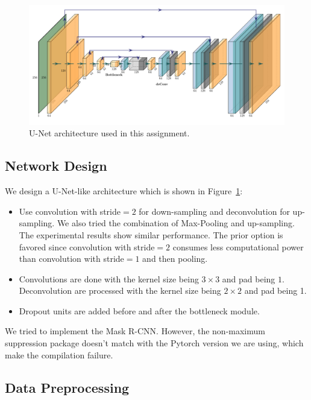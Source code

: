 \documentclass[runningheads]{llncs}
\begin{document}
\begin{figure}[ht]
	\centering
	\includegraphics[scale=0.5]{figures/Unet}
	\caption{U-Net architecture used in this assignment.}
	\label{fig:U-Net1}
\end{figure}

\subsection{Network Design}
We design a U-Net-like architecture which is shown in Figure~\ref{fig:U-Net1}:
\begin{itemize}
	\item Use convolution with stride$=2$ for down-sampling and deconvolution for up-sampling. We also tried the combination of Max-Pooling and up-sampling. The experimental results show similar performance. The prior option is favored since convolution with stride$=2$ consumes less computational power than convolution with stride$=1$ and then pooling.
	\item Convolutions are done with the kernel size being $3\times 3$ and pad being $1$. Deconvolution are processed with the kernel size being $2\times 2$ and pad being 1.
	\item Dropout units are added before and after the bottleneck module.
\end{itemize}
We tried to implement the Mask R-CNN. However, the non-maximum suppression package doesn't match with the Pytorch version we are using, which make the compilation failure. 

\subsection{Data Preprocessing}
\end{document}
